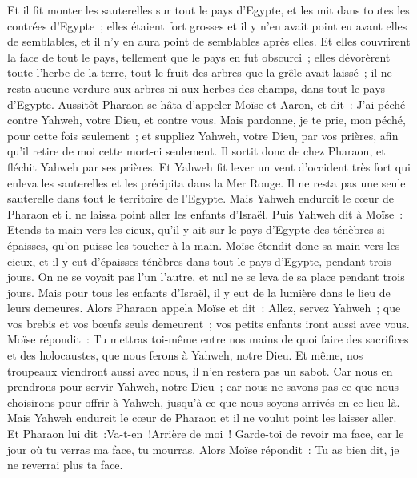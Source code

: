 \begin{multicols}{2}
Et il fit monter les sauterelles sur tout le pays d'Egypte, et les mit dans toutes les contrées d'Egypte~; elles étaient fort grosses et il y n'en avait point eu avant elles de semblables, et il n'y en aura point de semblables après elles.
Et elles couvrirent la face de tout le pays, tellement que le pays en fut obscurci~; elles dévorèrent toute l'herbe de la terre, tout le fruit des arbres que la grêle avait laissé~; il ne resta aucune verdure aux arbres ni aux herbes des champs, dans tout le pays d'Egypte.
Aussitôt Pharaon se hâta d'appeler Moïse et Aaron, et dit~: J'ai péché contre Yahweh, votre Dieu, et contre vous.
Mais pardonne, je te prie, mon péché, pour cette fois seulement~; et suppliez Yahweh, votre Dieu, par vos prières, afin qu'il retire de moi cette mort-ci seulement.
Il sortit donc de chez Pharaon, et fléchit Yahweh par ses prières.
Et Yahweh fit lever un vent d'occident très fort qui enleva les sauterelles et les précipita dans la Mer Rouge. Il ne resta pas une seule sauterelle dans tout le territoire de l'Egypte.
Mais Yahweh endurcit le cœur de Pharaon et il ne laissa point aller les enfants d'Israël.
Puis Yahweh dit à Moïse~: Etends ta main vers les cieux, qu'il y ait sur le pays d'Egypte des ténèbres si épaisses, qu'on puisse les toucher à la main.
Moïse étendit donc sa main vers les cieux, et il y eut d'épaisses ténèbres dans tout le pays d'Egypte, pendant trois jours.
On ne se voyait pas l'un l'autre, et nul ne se leva de sa place pendant trois jours. Mais pour tous les enfants d'Israël, il y eut de la lumière dans le lieu de leurs demeures.
Alors Pharaon appela Moïse et dit~: Allez, servez Yahweh~; que vos brebis et vos bœufs seuls demeurent~; vos petits enfants iront aussi avec vous.
Moïse répondit~: Tu mettras toi-même entre nos mains de quoi faire des sacrifices et des holocaustes, que nous ferons à Yahweh, notre Dieu.
Et même, nos troupeaux viendront aussi avec nous, il n'en restera pas un sabot. Car nous en prendrons pour servir Yahweh, notre Dieu~; car nous ne savons pas ce que nous choisirons pour offrir à Yahweh, jusqu'à ce que nous soyons arrivés en ce lieu là.
Mais Yahweh endurcit le cœur de Pharaon et il ne voulut point les laisser aller.
Et Pharaon lui dit~:Va-t-en~!Arrière de moi~! Garde-toi de revoir ma face, car le jour où tu verras ma face, tu mourras.
Alors Moïse répondit~: Tu as bien dit, je ne reverrai plus ta face.

\end{multicols}
